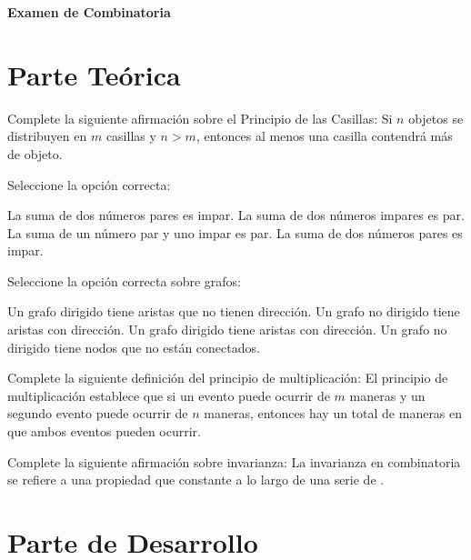 \documentclass[11pt,paper=a4,answers,addpoints]{exam}
\begin{document}
\noprintanswers
\shorthandoff{<>}

\begin{center}
  \Large \textbf{Examen de Combinatoria}
\end{center}

\vspace{5mm}


\begin{questions}

\section*{Parte Teórica}

\question Complete la siguiente afirmación sobre el Principio de las Casillas:
Si \( n \) objetos se distribuyen en \( m \) casillas y \( n > m \), entonces al menos una casilla contendrá más de \fillin[un] objeto.

\question Seleccione la opción correcta:
\begin{oneparchoices}
\choice La suma de dos números pares es impar.
\CorrectChoice La suma de dos números impares es par.
\choice La suma de un número par y uno impar es par.
\choice La suma de dos números pares es impar.
\end{oneparchoices}

\question Seleccione la opción correcta sobre grafos:
\begin{oneparchoices}
\choice Un grafo dirigido tiene aristas que no tienen dirección.
\choice Un grafo no dirigido tiene aristas con dirección.
\CorrectChoice Un grafo dirigido tiene aristas con dirección.
\choice Un grafo no dirigido tiene nodos que no están conectados.
\end{oneparchoices}

\question Complete la siguiente definición del principio de multiplicación:
El principio de multiplicación establece que si un evento puede ocurrir de \( m \) maneras y un segundo evento puede ocurrir de \( n \) maneras, entonces hay un total de \fillin[m \times n] maneras en que ambos eventos pueden ocurrir.

\question Complete la siguiente afirmación sobre invarianza:
La invarianza en combinatoria se refiere a una propiedad que \fillin[permanece] constante a lo largo de una serie de \fillin[operaciones].

\section*{Parte de Desarrollo}


\end{questions}
\end{document}
